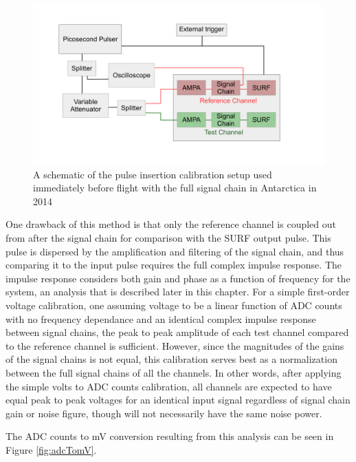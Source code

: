 			
	\begin{figure}
		\includegraphics[width=\textwidth]{figures/antarctica14_calSetup}
		\caption{A schematic of the pulse insertion calibration setup used immediately before flight with the full signal chain in Antarctica in 2014}
		\label{fig:calSetup}
	\end{figure}
		
	One drawback of this method is that only the reference channel is coupled out from after the signal chain for comparison with the SURF output pulse.  This pulse is dispersed by the amplification and filtering of the signal chain, and thus comparing it to the input pulse requires the full complex impulse response. The impulse response considers both gain and phase as a function of frequency for the system, an analysis that is described later in this chapter.  For a simple first-order voltage calibration, one assuming voltage to be a linear function of ADC counts with no frequency dependance and an identical complex impulse response between signal chains, the peak to peak amplitude of each test channel compared to the reference channel is sufficient.  However, since the magnitudes of the gains of the signal chains is not equal, this calibration serves best as a normalization between the full signal chains of all the channels.  In other words, after applying the simple volts to ADC counts calibration, all channels are expected to have equal peak to peak voltages for an identical input signal regardless of signal chain gain or noise figure, though will not necessarily have the same noise power.
		
	The ADC counts to mV conversion resulting from this analysis can be seen in Figure \ref{fig:adcTomV}.

